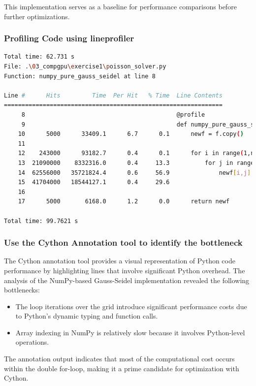 \documentclass[a4paper,12pt]{article}
\begin{document}
This implementation serves as a baseline for performance comparisons before further optimizations.

\subsubsection{Profiling Code using lineprofiler}
\begin{lstlisting}[language=bash,basicstyle=\tiny\ttfamily]
Total time: 62.731 s
File: .\03_compgpu\exercise1\poisson_solver.py
Function: numpy_pure_gauss_seidel at line 8

Line #      Hits         Time  Per Hit   % Time  Line Contents
==============================================================
     8                                           @profile
     9                                           def numpy_pure_gauss_seidel(f):
    10      5000      33409.1      6.7      0.1      newf = f.copy()
    11
    12    243000      93182.7      0.4      0.1      for i in range(1,newf.shape[0]-1):
    13  21090000    8332316.0      0.4     13.3          for j in range(1,newf.shape[1]-1):
    14  62556000   35721824.4      0.6     56.9              newf[i,j] = 0.25 * (newf[i,j+1] + newf[i,j-1] +
    15  41704000   18544127.1      0.4     29.6                                  newf[i+1,j] + newf[i-1,j])
    16
    17      5000       6168.0      1.2      0.0      return newf

Total time: 99.7621 s
\end{lstlisting}


\subsubsection{Use the Cython Annotation tool to identify the bottleneck}
The Cython annotation tool provides a visual representation of Python code performance by highlighting lines that involve significant Python overhead. The analysis of the NumPy-based Gauss-Seidel implementation revealed the following bottlenecks:
\begin{itemize}
    \item{The loop iterations over the grid introduce significant performance costs due to Python's dynamic typing and function calls.}
    \item{Array indexing in NumPy is relatively slow because it involves Python-level operations.}
\end{itemize}

The annotation output indicates that most of the computational cost occurs within the double for-loop, making it a prime candidate for optimization with Cython.
\end{document}
